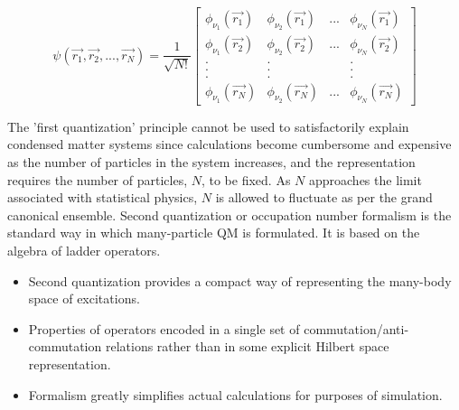 \documentclass{resonance}
\begin{document}
\begin{equation*}
    \psi(\vec{r_{1}}, \vec{r_{2}},..., \vec{r_{N}}) = \frac{1}{\sqrt{N!}} \begin{bmatrix}
        \phi_{\nu_{1}}(\vec{r_{1}}) & \phi_{\nu_{2}}(\vec{r_{1}}) & ... & \phi_{\nu_{N}}(\vec{r_{1}}) \\
        \phi_{\nu_{1}}(\vec{r_{2}}) & \phi_{\nu_{2}}(\vec{r_{2}}) & ... & \phi_{\nu_{N}}(\vec{r_{2}}) \\
        . & . &  & . \\
        . & . &  & . \\
        . & . &  & . \\
        \phi_{\nu_{1}}(\vec{r_{N}}) & \phi_{\nu_{2}}(\vec{r_{N}}) & ... & \phi_{\nu_{N}}(\vec{r_{N}})
    \end{bmatrix}
\end{equation*}

The 'first quantization' principle cannot be used to satisfactorily explain condensed matter systems since calculations become cumbersome and expensive as the number of particles in the system increases, and the representation requires the number of particles, $N$, to be fixed. As $N$ approaches the limit associated with statistical physics, $N$ is allowed to fluctuate as per the grand canonical ensemble. Second quantization or occupation number formalism is the standard way in which many-particle QM is formulated. It is based on the algebra of ladder operators. 
\begin{itemize}
    \item Second quantization provides a compact way of representing the many-body space of excitations.
    \item Properties of operators encoded in a single set of commutation/anti-commutation relations rather than in some explicit Hilbert space representation.
    \item Formalism greatly simplifies actual calculations for purposes of simulation.
\end{itemize}
\end{document}
